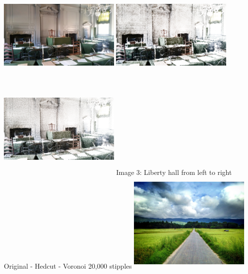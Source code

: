 \documentclass[11pt]{article}
\begin{document}
\newline
\newline\includegraphics[width=6cm, height=5cm]{libertyhall.png} 
\includegraphics[width=6cm, height=5cm]{libertyhall-hedcut-20000.png}
\includegraphics[width=6cm, height=5cm]{libertyhall-voronoi-20000.png}
\newline Image 3: Liberty hall from left to right Original - Hedcut - Voronoi 20,000 stipples
\newline 
\newline\includegraphics[width=6cm, height=5cm]{landscape.png} 
\end{document}
